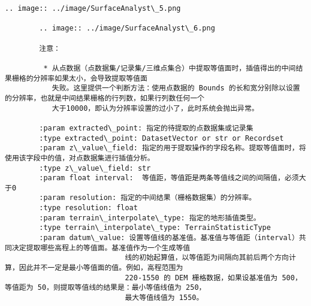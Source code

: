\documentclass[11pt]{article}
\begin{document}
\begin{Verbatim}[commandchars=\\\{\}]
        .. image:: ../image/SurfaceAnalyst\_5.png
        
        .. image:: ../image/SurfaceAnalyst\_6.png
        
        注意：
        
         * 从点数据（点数据集/记录集/三维点集合）中提取等值面时，插值得出的中间结果栅格的分辨率如果太小，会导致提取等值面
           失败。这里提供一个判断方法：使用点数据的 Bounds 的长和宽分别除以设置的分辨率，也就是中间结果栅格的行列数，如果行列数任何一个
           大于10000，即认为分辨率设置的过小了，此时系统会抛出异常。
        
        :param extracted\_point: 指定的待提取的点数据集或记录集
        :type extracted\_point: DatasetVector or str or Recordset
        :param z\_value\_field: 指定的用于提取操作的字段名称。提取等值面时，将使用该字段中的值，对点数据集进行插值分析。
        :type z\_value\_field: str
        :param float interval:  等值距，等值距是两条等值线之间的间隔值，必须大于0
        :param resolution: 指定的中间结果（栅格数据集）的分辨率。
        :type resolution: float
        :param terrain\_interpolate\_type: 指定的地形插值类型。
        :type terrain\_interpolate\_type: TerrainStatisticType
        :param datum\_value: 设置等值线的基准值。基准值与等值距（interval）共同决定提取哪些高程上的等值面。基准值作为一个生成等值
                            线的初始起算值，以等值距为间隔向其前后两个方向计算，因此并不一定是最小等值面的值。例如，高程范围为
                            220-1550 的 DEM 栅格数据，如果设基准值为 500，等值距为 50，则提取等值线的结果是：最小等值线值为 250，
                            最大等值线值为 1550。
        

\end{Verbatim}
\end{document}
